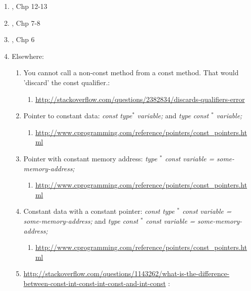 \begin{enumerate}
\begin{enumerate}
	\item \cite{Allain2012}, Chp 12-13
	\item \cite{Prata2012}, Chp 7-8
	\item \cite{Lippman2013}, Chp 6
	\item Elsewhere: \vspace{-0.2cm}
		\begin{enumerate} \itemsep -2pt
		\item You cannot call a non-const method from a const method. That would 'discard' the const qualifier.: \vspace{-0.1cm}
			\begin{enumerate} \itemsep -1pt
			\item \url{http://stackoverflow.com/questions/2382834/discards-qualifiers-error}
			\end{enumerate}
		\item Pointer to constant data: {\it const type$^{\ast}$ variable;} and {\it type const $^{\ast}$ variable;} \vspace{-0.1cm}
			\begin{enumerate} \itemsep -1pt
			\item \url{http://www.cprogramming.com/reference/pointers/const_pointers.html}
			\end{enumerate}
		\item Pointer with constant memory address: {\it type $^{\ast}$ const variable = some-memory-address;} \vspace{-0.1cm}
			\begin{enumerate} \itemsep -1pt
			\item \url{http://www.cprogramming.com/reference/pointers/const_pointers.html}
			\end{enumerate}
		\item Constant data with a constant pointer: {\it const type $^{\ast}$ const variable = some-memory-address;} and {\it type const $^{\ast}$ const variable = some-memory-address;} \vspace{-0.1cm}
			\begin{enumerate} \itemsep -1pt
			\item \url{http://www.cprogramming.com/reference/pointers/const_pointers.html}
			\end{enumerate}
		\item \url{http://stackoverflow.com/questions/1143262/what-is-the-difference-between-const-int-const-int-const-and-int-const} \cite{Mortensen2015}: \vspace{-0.1cm}
			\begin{enumerate} \itemsep -1pt

\end{enumerate}
\end{enumerate}
\end{enumerate}
\end{enumerate}
